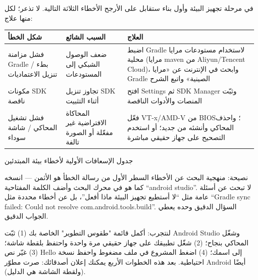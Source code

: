 
في مرحلة تجهيز البيئة وأول بناء ستقابل على الأرجح الأخطاء الثلاثة التالية. لا تذعر؛ لكل منها علاج:

\begin{center}
\begin{tabularx}{\linewidth}{|X|X|X|}
\hline
\textbf{شكل الخطأ} & \textbf{السبب الشائع} & \textbf{العلاج} \tabularnewline
\hline
فشل مزامنة Gradle / بطء تنزيل الاعتماديات & ضعف الوصول الشبكي إلى المستودعات & اضبط Gradle لاستخدام مستودعات مرايا محلية (مرايا maven من Aliyun/Tencent Cloud)، وابحث في الإنترنت عن «مرايا Gradle الصينية» واتبع الشرح \tabularnewline
مكونات SDK ناقصة & تجاوز تنزيل SDK أثناء التثبيت & افتح Settings ثم SDK Manager وثبّت المنصات والأدوات الناقصة \tabularnewline
فشل تشغيل المحاكي / شاشة سوداء & المحاكاة الافتراضية غير مفعّلة أو الصورة تالفة & فعّل VT-x/AMD-V من BIOS؛ واحذف المحاكي وأنشئه من جديد؛ أو استخدم التصحيح على جهاز حقيقي مباشرة \tabularnewline
\hline
\end{tabularx}
\end{center}

\begin{center}\small\color{gray}جدول الإسعافات الأولية لأخطاء بيئة المبتدئين\end{center}

\begin{tcbinfo}{نصيحة: منهجية البحث عن الأخطاء}
السطر الأول من رسالة الخطأ هو الأثمن — انسخه كما هو في محرك البحث وأضف الكلمة المفتاحية “android studio”. لا تبحث عن أسئلة عامة مثل “لا أستطيع تجهيز البيئة ماذا أفعل”، بل عن أخطاء محددة مثل “Gradle sync failed: Could not resolve com.android.tools.build”. السؤال الدقيق وحده يعطي الجواب الدقيق.

\end{tcbinfo}

\begin{tcbpractice}{لنتجرب: أكمل قائمة "طقوس التطوير" الخاصة بك}
(1) ثبّت Android Studio وشغّل المحاكي بنجاح؛ (2) شغّل تطبيقك على جهاز حقيقي مرة واحدة واحتفظ بلقطة شاشة؛ (3) غيّر نص Hello إلى اسمك؛ (4) اضغط المشروع في ملف مضغوط واحفظ نسخة احتياطية. بعد هذه الخطوات الأربع يمكنك إعلان أصدقائك: صرت مطوّر Android أيضًا (ولقطة الشاشة هي الدليل).

\end{tcbpractice}

